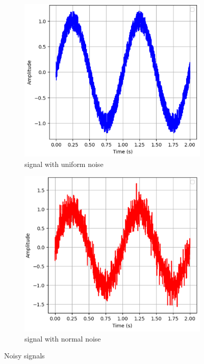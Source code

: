 \documentclass[hidelinks,12pt]{article}
\begin{document}
	\begin{figure}[h!]
		\centering
		\begin{subfigure}[b]{0.45\textwidth}
			\centering
			\includegraphics[width=\textwidth]{figures/sin_uniform_noise.PNG}
			\caption{signal with uniform noise}
		\end{subfigure}
		\hspace{0.5cm}
		\begin{subfigure}[b]{0.45\textwidth}
			\centering
			\includegraphics[width=\textwidth]{figures/sin_normal_noise.PNG}
			\caption{signal with normal noise}
		\end{subfigure}
		\caption{Noisy signals}
	\end{figure}
	
\end{document}
